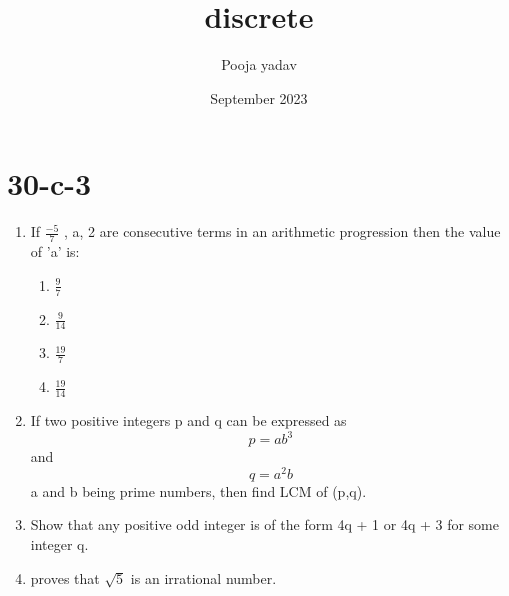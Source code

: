 \documentclass{article}
\title{discrete}
\author{Pooja yadav}
\date{September 2023}
\begin{document}
\maketitle
\section{30-c-3}

\begin{enumerate}

\item If  \(\frac{-5}{7}\)
 , a, 2 are consecutive terms in an arithmetic progression then the value of 'a' is:
   \begin{enumerate}
   
    \item \(\frac{9}{7}\)
    \item \(\frac{9}{14}\)
    \item \(\frac{19}{7}\)
    \item \(\frac{19}{14}\)


\end{enumerate}

 \item If two positive integers p and q can be expressed as \[p = ab^3\] and \[q = a^2b\] a and b being prime numbers, then find LCM of (p,q).

\item Show that any positive odd integer is of the form 4q + 1 or 4q + 3 for some integer q.
\item proves that $\sqrt{5}$ is an irrational number.


\end{enumerate}
\end{document}
